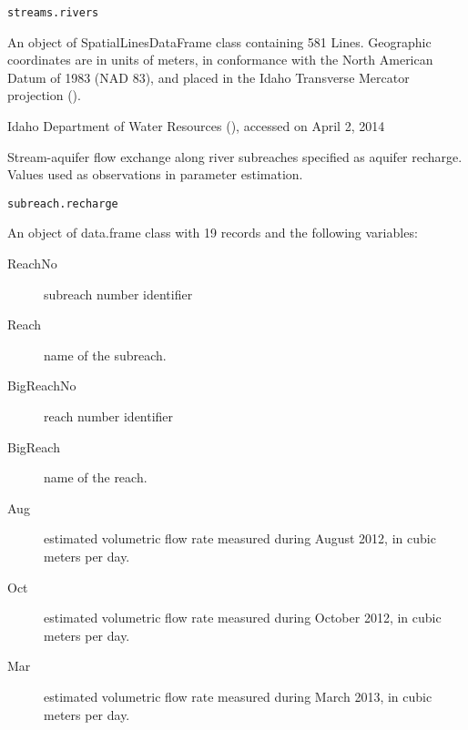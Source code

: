 \documentclass[a4paper]{book}
\begin{document}
%
\begin{Usage}
\begin{verbatim}
streams.rivers
\end{verbatim}
\end{Usage}
%
\begin{Format}
An object of SpatialLinesDataFrame class containing 581 Lines.
Geographic coordinates are in units of meters, in conformance with the
North American Datum of 1983 (NAD 83), and placed in the
Idaho Transverse Mercator projection ().
\end{Format}
%
\begin{Source}\relax
Idaho Department of Water Resources
(),
accessed on April 2, 2014
\end{Source}
%
\begin{Examples}
\end{Examples}
%
\begin{Description}\relax
Stream-aquifer flow exchange along river subreaches specified as aquifer recharge.
Values used as observations in parameter estimation.
\end{Description}
%
\begin{Usage}
\begin{verbatim}
subreach.recharge
\end{verbatim}
\end{Usage}
%
\begin{Format}
An object of data.frame class with 19 records and the following variables:
\begin{description}

\item[ReachNo] subreach number identifier
\item[Reach] name of the subreach.
\item[BigReachNo] reach number identifier
\item[BigReach] name of the reach.
\item[Aug] estimated volumetric flow rate measured during August 2012,
in cubic meters per day.
\item[Oct] estimated volumetric flow rate measured during October 2012,
in cubic meters per day.
\item[Mar] estimated volumetric flow rate measured during March 2013,
in cubic meters per day.

\end{description}

\end{Format}
\end{document}
